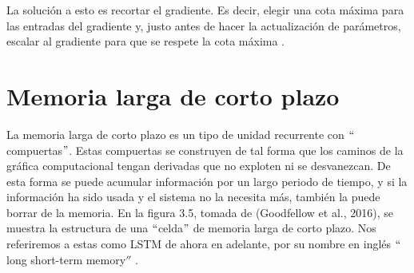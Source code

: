 \vspace{1em}

La solución a esto es recortar el gradiente. Es decir, elegir una cota máxima para las entradas del gradiente y, justo antes de hacer la actualización de parámetros, escalar al gradiente para que se respete la cota máxima \cite{goodfellow-et-al-2016} \cite{DBLP:journals/corr/Graves13} \cite{DBLP:journals/corr/abs-1211-5063}.

\section{Memoria larga de corto plazo}
La memoria larga de corto plazo es un tipo de unidad recurrente con $``$compuertas$"$. Estas compuertas se construyen de tal forma que los caminos de la gráfica computacional tengan derivadas que no exploten ni se desvanezcan. De esta forma se puede acumular información por un largo periodo de tiempo, y si la información ha sido usada y el sistema no la necesita más, también la puede borrar de la memoria. En la figura 3.5, tomada de (Goodfellow et al., 2016), se muestra la estructura de una $``$celda$"$ de memoria larga de corto plazo. Nos referiremos a estas como LSTM de ahora en adelante, por su nombre en inglés $``$long short-term memory$''$ \cite{Gers:2000} \cite{goodfellow-et-al-2016} \cite{Hochreiter:1997:LSM:1246443.1246450}.

\vspace{1em}

